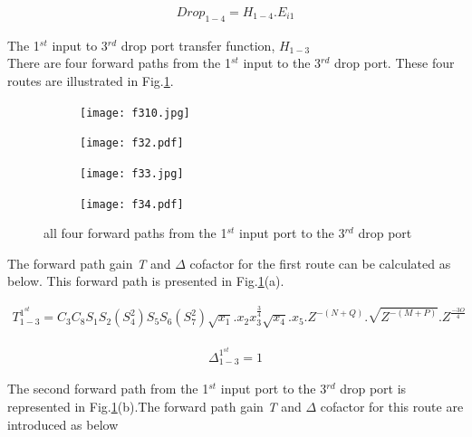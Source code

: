 \documentclass{osa-article}
\begin{document}
\begin{equation}
\begin{split}
Drop_{1-4}=H_{1-4}.E_{i1}
\end{split}
\end{equation}

The 1$^{st}$ input to 3$^{rd}$ drop port transfer function, $H_{1-3}$\\

There are four forward paths from the 1$^{st}$ input to the 3$^{rd}$ drop port.  These four routes are illustrated in Fig.\ref{figa4}.
\begin{figure}[h!]
  \centering
  \begin{subfigure}[b]{0.4\linewidth}
    \texttt{[image: f310.jpg]}
    \caption{}
  \end{subfigure}
  \begin{subfigure}[b]{0.4\linewidth}
    \texttt{[image: f32.pdf]}
    \caption{}
  \end{subfigure}
  \begin{subfigure}[b]{0.4\linewidth}
    \texttt{[image: f33.jpg]}
    \caption{}
  \end{subfigure}
  \begin{subfigure}[b]{0.4\linewidth}
    \texttt{[image: f34.pdf]}
    \caption{}
  \end{subfigure}
  \caption{all four forward paths from the 1$^{st}$ input port to the 3$^{rd}$ drop port}
  \label{figa4}
\end{figure}
The forward path gain \textit {T} and $\Delta$ cofactor for the first route can be calculated as below. This forward path is presented in Fig.\ref{figa4}(a).

\begin{equation}
\begin{split}
T^{1^{st}}_{1-3}=C_3C_8S_1S_2(S^2_4)S_5S_6(S^2_7)\sqrt{x_1}.x_{2}{x^{\frac{3}{4}}_3}\sqrt{x_4}.x_{5}.Z^{-(N+Q)}.\sqrt{Z^{-(M+P)}}.Z^{\frac{-3O}{4}}
\end{split}
\end{equation}

\begin{equation}
\begin{split}
\Delta^{1^{st}}_{1-3}=1
\end{split}
\end{equation}

The second forward path from the 1$^{st}$ input port to the 3$^{rd}$ drop port is represented in Fig.\ref{figa4}(b).The forward path gain \textit {T} and $\Delta$ cofactor for this route are introduced as below
\end{document}

